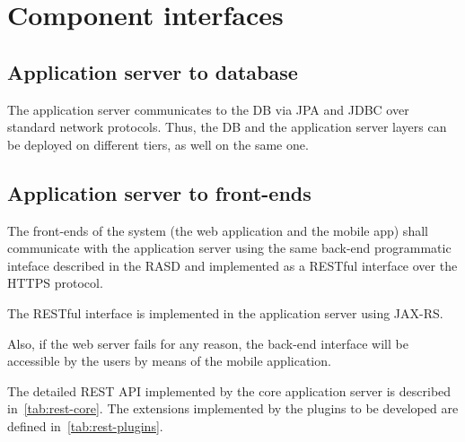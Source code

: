 \section{Component interfaces}
\label{sec:component-interfaces}

\subsection{Application server to database}
The application server communicates to the DB via JPA and JDBC over standard network protocols. Thus, the DB and the application server layers can be deployed on different tiers, as well on the same one.

\subsection{Application server to front-ends}
The front-ends of the system (the web application and the mobile app) shall communicate with the application server using the same back-end programmatic inteface described in the RASD and implemented as a RESTful interface over the HTTPS protocol.

The RESTful interface is implemented in the application server using JAX-RS.

Also, if the web server fails for any reason, the back-end interface will be accessible by the users by means of the mobile application.

The detailed REST API implemented by the core application server is described in~\autoref{tab:rest-core}. The extensions implemented by the plugins to be developed are defined in~\autoref{tab:rest-plugins}.

